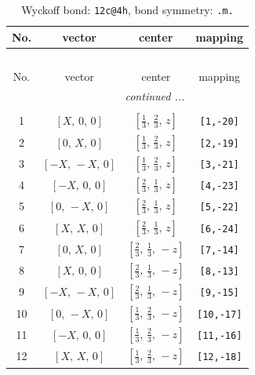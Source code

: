 \documentclass[fleqn,8pt]{jsarticle}
\begin{document}
\renewcommand{\arraystretch}{1.2}
\begin{longtable}{cccc}
\caption{Wyckoff bond: {\tt 12c@4h}, bond symmetry: {\tt .m.}}
 \\
 \hline \hline
No. & vector & center & mapping \\ \hline \endfirsthead

\multicolumn{3}{l}{\tablename\ \thetable{}} \\
 \hline \hline
No. & vector & center & mapping \\ \hline \endhead

 \hline \hline
\multicolumn{3}{r}{\footnotesize\it continued ...} \\ \endfoot

 \hline \hline
\multicolumn{3}{r}{} \\ \endlastfoot

1 & $\left[ X,\, 0,\, 0 \right]$ & $\left[ \frac{1}{3},\, \frac{2}{3},\, z \right]$ & {\tt [1,-20]} \\ \hline
2 & $\left[ 0,\, X,\, 0 \right]$ & $\left[ \frac{1}{3},\, \frac{2}{3},\, z \right]$ & {\tt [2,-19]} \\ \hline
3 & $\left[ - X,\, - X,\, 0 \right]$ & $\left[ \frac{1}{3},\, \frac{2}{3},\, z \right]$ & {\tt [3,-21]} \\ \hline
4 & $\left[ - X,\, 0,\, 0 \right]$ & $\left[ \frac{2}{3},\, \frac{1}{3},\, z \right]$ & {\tt [4,-23]} \\ \hline
5 & $\left[ 0,\, - X,\, 0 \right]$ & $\left[ \frac{2}{3},\, \frac{1}{3},\, z \right]$ & {\tt [5,-22]} \\ \hline
6 & $\left[ X,\, X,\, 0 \right]$ & $\left[ \frac{2}{3},\, \frac{1}{3},\, z \right]$ & {\tt [6,-24]} \\ \hline
7 & $\left[ 0,\, X,\, 0 \right]$ & $\left[ \frac{2}{3},\, \frac{1}{3},\, - z \right]$ & {\tt [7,-14]} \\ \hline
8 & $\left[ X,\, 0,\, 0 \right]$ & $\left[ \frac{2}{3},\, \frac{1}{3},\, - z \right]$ & {\tt [8,-13]} \\ \hline
9 & $\left[ - X,\, - X,\, 0 \right]$ & $\left[ \frac{2}{3},\, \frac{1}{3},\, - z \right]$ & {\tt [9,-15]} \\ \hline
10 & $\left[ 0,\, - X,\, 0 \right]$ & $\left[ \frac{1}{3},\, \frac{2}{3},\, - z \right]$ & {\tt [10,-17]} \\ \hline
11 & $\left[ - X,\, 0,\, 0 \right]$ & $\left[ \frac{1}{3},\, \frac{2}{3},\, - z \right]$ & {\tt [11,-16]} \\ \hline
12 & $\left[ X,\, X,\, 0 \right]$ & $\left[ \frac{1}{3},\, \frac{2}{3},\, - z \right]$ & {\tt [12,-18]} \\
\end{longtable}
\end{document}
